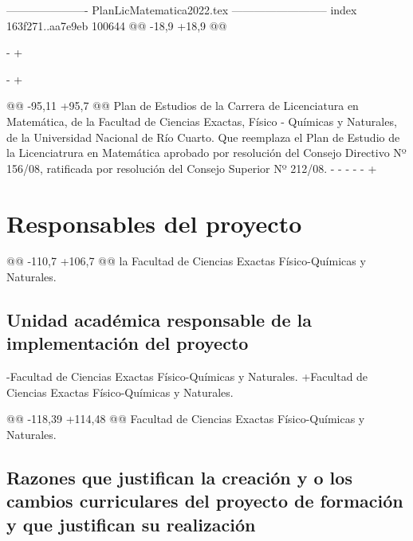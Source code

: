 ---------------------- PlanLicMatematica2022.tex --------------------------
index 163f271..aa7e9eb 100644
@@ -18,9 +18,9 @@
 \usepackage{colortbl}
 \usepackage{graphics}
-
+\usepackage{ltablex}
 \usepackage{cite}
-
+\usepackage{lscape}
 
 
 \newenvironment{colortext}[1]{\color{#1}}{\ignorespacesafterend}
@@ -95,11 +95,7 @@ Plan de Estudios de la
 Carrera de Licenciatura en Matemática, de la Facultad de Ciencias Exactas, 
 Físico - Químicas y Naturales, de la Universidad Nacional de Río Cuarto. Que reemplaza el Plan de Estudio de la Licenciatrura en Matemática aprobado por resolución del Consejo Directivo Nº 156/08, 
 ratificada por resolución del Consejo Superior Nº 212/08.
-%
-%
-%
-%
-%
+
 
 \section{Responsables del proyecto}
 
@@ -110,7 +106,7 @@ la Facultad de Ciencias Exactas Físico-Químicas y Naturales.
 
 \subsection{Unidad académica responsable de la implementación del proyecto}
 
-Facultad de Ciencias Exactas Físico-Químicas y Naturales.
+Facultad de Ciencias Exactas Físico-Químicas y Naturales. 
 
 
 
@@ -118,39 +114,48 @@ Facultad de Ciencias Exactas Físico-Químicas y Naturales.
 
 \subsection{Razones que justifican la creación y o los cambios curriculares del proyecto de formación  y que justifican su realización}
 
